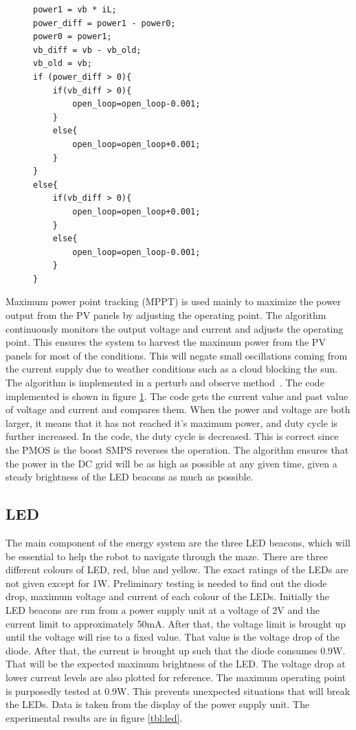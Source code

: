 \begin{figure}
    \footnotesize
    \begin{verbatim}
power1 = vb * iL;
power_diff = power1 - power0;
power0 = power1;
vb_diff = vb - vb_old;
vb_old = vb;
if (power_diff > 0){
    if(vb_diff > 0){
        open_loop=open_loop-0.001;
    }
    else{
        open_loop=open_loop+0.001;
    }
}
else{
    if(vb_diff > 0){
        open_loop=open_loop+0.001;
    }
    else{
        open_loop=open_loop-0.001;
    }
}
    \end{verbatim}
    \caption{}
    \label{code:pert_observe}
\end{figure}

Maximum power point tracking (MPPT) is used mainly to maximize the power output from the PV panels by adjusting the operating point. The algorithm continuously monitors the output voltage and current and adjusts the operating point. This ensures the system to harvest the maximum power from the PV panels for most of the conditions. This will negate small oscillations coming from the current supply due to weather conditions such as a cloud blocking the sun. The algorithm is implemented in a perturb and observe method~\cite{ref:mppt}. The code implemented is shown in figure \ref{code:pert_observe}. The code gets the current value and past value of voltage and current and compares them. When the power and voltage are both larger, it means that it has not reached it’s maximum power, and duty cycle is further increased. In the code, the duty cycle is decreased. This is correct since the PMOS is the boost SMPS reverses the operation. The algorithm ensures that the power in the DC grid will be as high as possible at any given time, given a steady brightness of the LED beacons as much as possible.


\subsection{LED}

The main component of the energy system are the three LED beacons, which will be essential to help the robot to navigate through the maze. There are three different colours of LED, red, blue and yellow. The exact ratings of the LEDs are not given except for 1W. Preliminary testing is needed to find out the diode drop, maximum voltage and current of each colour of the LEDs. Initially the LED beacons are run from a power supply unit at a voltage of 2V and the current limit to approximately 50mA. After that, the voltage limit is brought up until the voltage will rise to a fixed value. That value is the voltage drop of the diode. After that, the current is brought up such that the diode consumes 0.9W. That will be the expected maximum brightness of the LED. The voltage drop at lower current levels are also plotted for reference. The maximum operating point is purposedly tested at 0.9W. This prevents unexpected situations that will break the LEDs. Data is taken from the display of the power supply unit. The experimental results are in figure \ref{tbl:led}.

